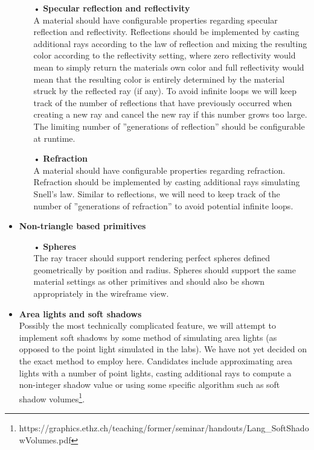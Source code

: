 \documentclass[a4paper,11pt]{article}
\begin{document}
\begin{itemize}
\begin{itemize}
\item[•] \textbf{Specular reflection and reflectivity}\\
A material should have configurable properties regarding specular reflection and reflectivity.
Reflections should be implemented by casting additional rays according to the law of reflection
and mixing the resulting color according to the reflectivity setting, where zero reflectivity would
mean to simply return the materials own color and full reflectivity would mean that the resulting
color is entirely determined by the material struck by the reflected ray (if any). To avoid infinite
loops we will keep track of the number of reflections that have previously occurred when creating a
new ray and cancel the new ray if this number grows too large. The limiting number of
''generations of reflection'' should be configurable at runtime.

\item[•] \textbf{Refraction}\\
A material should have configurable properties regarding refraction. Refraction should be implemented
by casting additional rays simulating Snell's law. Similar to reflections, we will need to keep
track of the number of ''generations of refraction'' to avoid potential infinite loops.

\end{itemize}

\item \textbf{Non-triangle based primitives}
\begin{itemize}
\item[•] \textbf{Spheres}\\
The ray tracer should support rendering perfect spheres defined geometrically by position and radius. Spheres
should support the same material settings as other primitives and should also be shown appropriately
in the wireframe view.
\end{itemize}

\item \textbf{Area lights and soft shadows}\\
Possibly the most technically complicated feature, we will attempt to implement soft shadows by
some method of simulating area lights (as opposed to the point light simulated in the labs). We have
not yet decided on the exact method to employ here. Candidates include approximating area lights with
a number of point lights, casting additional rays to compute a non-integer shadow 
value or using some specific algorithm such as soft shadow volumes\footnote{https://graphics.ethz.ch/teaching/former/seminar/handouts/Lang\_SoftShadowVolumes.pdf}.

\end{itemize}
\end{document}
